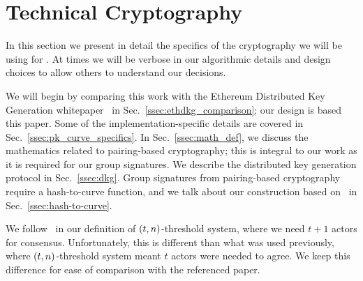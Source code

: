 \section{Technical Cryptography}
\label{sec:tech_crypto}

In this section we present in detail the specifics of the
cryptography we will be using for \LayerTwo{}.
At times we will be verbose in our algorithmic details
and design choices to allow others to understand our decisions.

We will begin by comparing this work with the
Ethereum Distributed Key Generation whitepaper~\cite{ethdkg}
in Sec.~\ref{ssec:ethdkg_comparison};
our design is based this paper.
Some of the implementation-specific details are covered in
Sec.~\ref{ssec:pk_curve_specifics}.
In Sec.~\ref{ssec:math_def}, we discuss the mathematics
related to pairing-based cryptography; this is integral to
our work as it is required for our group signatures.
We describe the distributed key generation protocol in
Sec.~\ref{ssec:dkg}.
Group signatures from pairing-based cryptography require
a hash-to-curve function, and we talk about our construction
based on~\cite{ft2012bnhashtocurve,boneh2019h2cBLS12}
in Sec.~\ref{ssec:hash-to-curve}.

We follow~\cite{ethdkg} in our definition of
$\left( t,n \right)$-threshold system, where we need $t+1$ actors
for consensus.
Unfortunately, this is different than what was used previously,
where $\left( t,n \right)$-threshold system meant $t$ actors were
needed to agree.
We keep this difference for ease of comparison with the referenced paper.






